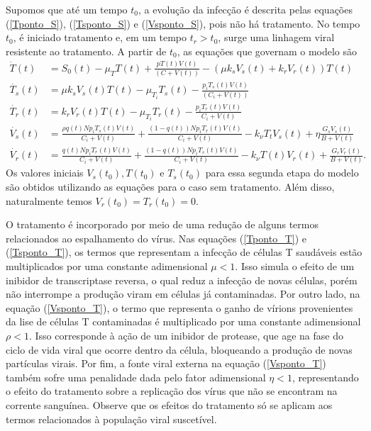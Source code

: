 Supomos que até um tempo \( t_{ 0 } \), a evolução da infecção é descrita pelas equações (\ref{Tponto_S}), (\ref{Tsponto_S}) e (\ref{Vsponto_S}), pois não há tratamento.
No tempo \( t_{ 0 } \), é iniciado tratamento e, em um tempo \( t_{ r } > t_{ 0 } \), surge uma linhagem viral resistente ao tratamento.
A partir de \( t_{ 0 } \), as equações que governam o modelo são
\begin{align}
    \dot{T}( t ) &= S_{ 0 } ( t ) - \mu_{ T } T ( t ) + \frac{ p T ( t ) V ( t ) }{ ( C + V ( t ) ) } - ( \mu k_{ s } V_{ s } ( t ) + k_{ r } V_{ r } ( t ) ) T ( t ) \label{Tponto_T}\\
    \dot{T_{ s }} ( t ) &= \mu k_{ s } V_{ s } ( t ) T ( t ) - \mu_{ T_{ i } } T_{ s } ( t ) - \frac{ p_{ i } T_{ s } ( t ) V ( t ) }{ ( C_{ i } + V ( t ) ) } \label{Tsponto_T} \\
    \dot{ T_{ r } } ( t ) &= k_{ r } V_{ r } ( t ) T ( t ) - \mu_{ T_{ i } } T_{ r } ( t ) - \frac{ p_{ i } T_{ r } ( t ) V ( t ) }{ C_{ i } + V ( t ) } \label{Trponto_T} \\
    \dot{V_{ s } } ( t ) &= \frac{ \rho q ( t ) N p_{ i } T_{ s } ( t ) V ( t ) }{ C_{ i } + V ( t ) } + \frac{ ( 1 - q ( t ) ) N p_{ i } T_{ r } ( t ) V ( t ) }{ C_{ i } + V ( t ) } - k_{ \nu } T_{ t } V_{ s } ( t ) + \eta \frac{ G_{ s } V_{ s } ( t ) }{ B + V ( t ) } \label{Vsponto_T} \\
    \dot{ V_{ r }} ( t ) &= \frac{ q ( t ) N p_{ i } T_{ r } ( t ) V ( t ) }{ C_{ i } + V ( t ) } + \frac{ ( 1 - q ( t ) ) N p_{ i } T_{ s } ( t ) V ( t ) }{ C_{ i } + V ( t ) } - k_{ \nu } T ( t ) V_{ r } ( t ) + \frac{ G_{ r } V_{ r } ( t ) }{ B + V ( t ) } \label{Vrponto_T}
.\end{align}
Os valores iniciais \( V_{ s } ( t_{ 0 } ), T ( t_{ 0 } ) \) e \( T_{ s } ( t_{ 0 } ) \) para essa segunda etapa do modelo são obtidos utilizando as equações para o caso sem tratamento.
Além disso, naturalmente temos \( V_{ r } ( t_{ 0 } ) = T_{ r } ( t_{ 0 } ) = 0 \).

O tratamento é incorporado por meio de uma redução de alguns termos relacionados ao espalhamento do vírus.
Nas equações (\ref{Tponto_T}) e (\ref{Tsponto_T}), os termos que representam a infecção de células T saudáveis estão multiplicados por uma constante adimensional \( \mu < 1 \).
Isso simula o efeito de um inibidor de transcriptase reversa, o qual reduz a infecção de novas células, porém não interrompe a produção viram em células já contaminadas.
Por outro lado, na equação (\ref{Vsponto_T}), o termo que representa o ganho de vírions provenientes da lise de células T contaminadas é multiplicado por uma constante adimensional \( \rho < 1 \).
Isso corresponde à ação de um inibidor de protease, que age na fase do ciclo de vida viral que ocorre dentro da célula, bloqueando a produção de novas partículas virais.
Por fim, a fonte viral externa na equação (\ref{Vsponto_T}) também sofre uma penalidade dada pelo fator adimensional \( \eta < 1 \), representando o efeito do tratamento sobre a replicação dos vírus que não se encontram na corrente sanguínea.
Observe que os efeitos do tratamento só se aplicam aos termos relacionados à população viral suscetível.

